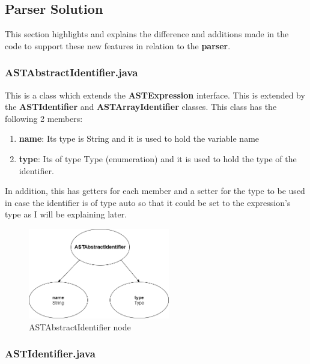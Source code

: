 \documentclass{article}
\begin{document}
		\subsection{Parser Solution}
		
		This section highlights and explains the difference and additions made in the code to support these new features in relation to the \textbf{parser}.
		
		\subsubsection{ASTAbstractIdentifier.java}
					
					This is a class which extends the \textbf{ASTExpression} interface. This is extended by the \textbf{ASTIdentifier} and \textbf{ASTArrayIdentifier} classes. This class has the following 2 members: 
					\begin{enumerate}
					\item \textbf{name}: Its type is String and it is used to hold the variable name
					\item \textbf{type}: Its of type Type (enumeration) and it is used to hold the type of the identifier.
				
					\end{enumerate}
			In addition, this has getters for each member and a setter for the type to be used in case the identifier is of type auto so that it could be set to the expression's type as I will be explaining later.
			
			\begin{figure}[H]
					\centering
			 			\includegraphics[width=0.55\textwidth]{astabstractid.png}
			  			\caption{ASTAbstractIdentifier node}
			  			\label{fig:astabstractid}
					\end{figure}
	
					
					
		\subsubsection{ASTIdentifier.java}
					
\end{document}
